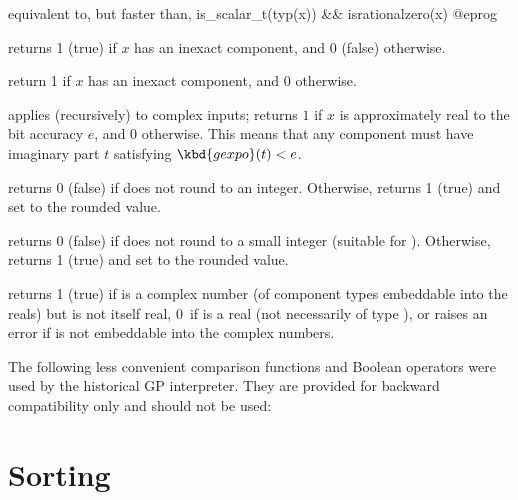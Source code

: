  equivalent to, but faster than,
\bprog
  is_scalar_t(typ(x)) && isrationalzero(x)
@eprog

 returns 1 (true) if $x$ has an inexact
component, and 0 (false) otherwise.

 return 1 if $x$ has an inexact
 component, and 0  otherwise.

 applies (recursively) to complex inputs;
returns $1$ if $x$ is approximately real to the bit accuracy $e$, and 0
otherwise. This means that any  component must have imaginary part
$t$ satisfying $\kbd{gexpo}(t) < e$.

 returns 0 (false) if  does not round
to an integer. Otherwise, returns 1 (true) and set  to the rounded
value.

 returns 0 (false) if  does not
round to a small integer (suitable for ). Otherwise, returns 1
(true) and set  to the rounded value.

 returns 1 (true) if  is a complex number
(of component types embeddable into the reals) but is not itself real, 0~if
 is a real (not necessarily of type ), or raises an error if
 is not embeddable into the complex numbers.


The following less convenient comparison functions and Boolean operators were
used by the historical GP interpreter. They are provided for backward
compatibility only and should not be used:










\section{Sorting}

